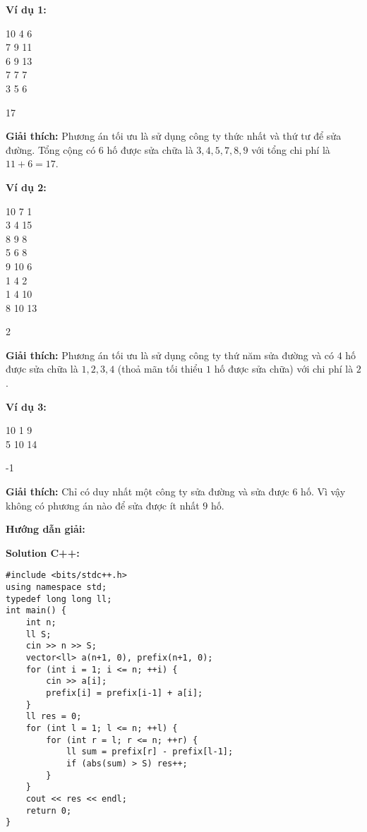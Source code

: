 \documentclass[12pt]{scrartcl}  %
\begin{document}
\textbf{Ví dụ 1:}
\begin{tcolorbox}[colback=gray!5!white, colframe=blue!50!black, title=Input]
10 4 6\\
7 9 11\\
6 9 13\\
7 7 7\\
3 5 6
\end{tcolorbox}
\begin{tcolorbox}[colback=gray!5!white, colframe=green!50!black, title=Output]
17
\end{tcolorbox}

\textbf{Giải thích:}
Phương án tối ưu là sử dụng công ty thức nhất và thứ tư để sửa đường. Tổng cộng có $6$ hố được sửa chữa là $3, 4, 5, 7, 8, 9$ với tổng chi phí là $11 + 6 = 17$.

\textbf{Ví dụ 2:}
\begin{tcolorbox}[colback=gray!5!white, colframe=blue!50!black, title=Input]
10 7 1\\
3 4 15\\
8 9 8\\
5 6 8\\
9 10 6\\
1 4 2\\
1 4 10\\
8 10 13
\end{tcolorbox}
\begin{tcolorbox}[colback=gray!5!white, colframe=green!50!black, title=Output]
2
\end{tcolorbox}

\textbf{Giải thích:}
Phương án tối ưu là sử dụng công ty thứ năm sửa đường và có $4$ hố được sửa chữa là $1, 2, 3, 4$ (thoả mãn tối thiểu $1$ hố được sửa chữa) với chi phí là $2$.

\textbf{Ví dụ 3:}
\begin{tcolorbox}[colback=gray!5!white, colframe=blue!50!black, title=Input]
10 1 9\\
5 10 14
\end{tcolorbox}
\begin{tcolorbox}[colback=gray!5!white, colframe=green!50!black, title=Output]
-1
\end{tcolorbox}

\textbf{Giải thích:}
Chỉ có duy nhất một công ty sửa đường và sửa được $6$ hố. Vì vậy không có phương án nào để sửa được ít nhất $9$ hố.

\textbf{Hướng dẫn giải:}

\textbf{Solution C++:}
\begin{lstlisting}
#include <bits/stdc++.h>
using namespace std;
typedef long long ll;
int main() {
    int n;
    ll S;
    cin >> n >> S;
    vector<ll> a(n+1, 0), prefix(n+1, 0);
    for (int i = 1; i <= n; ++i) {
        cin >> a[i];
        prefix[i] = prefix[i-1] + a[i];
    }
    ll res = 0;
    for (int l = 1; l <= n; ++l) {
        for (int r = l; r <= n; ++r) {
            ll sum = prefix[r] - prefix[l-1];
            if (abs(sum) > S) res++;
        }
    }
    cout << res << endl;
    return 0;
}
\end{lstlisting}
\end{document}
